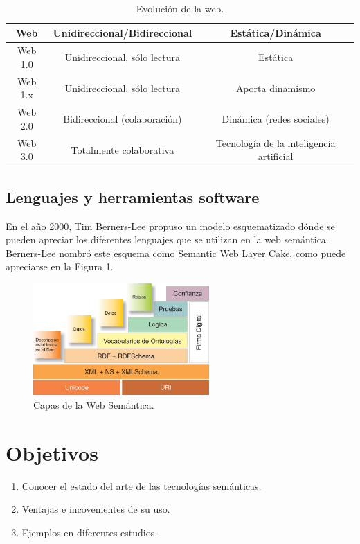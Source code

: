 \documentclass{article}
\begin{document}
\begin{table}[h]
\centering
\begin{tabular}{c c c} 
Web & Unidireccional/Bidireccional & Estática/Dinámica \\ \hline
Web 1.0 & Unidireccional, sólo lectura & Estática\\
Web 1.x & Unidireccional, sólo lectura & Aporta dinamismo \\
Web 2.0 & Bidireccional (colaboración) & Dinámica (redes sociales)\\
Web 3.0 & Totalmente colaborativa & Tecnología de la inteligencia artificial 
\end{tabular}
\caption{\label{tab:tabla ejemplo}Evolución de la web.}
\end{table}

\subsection{Lenguajes y herramientas software}
En el año 2000, Tim Berners-Lee propuso un modelo esquematizado dónde se pueden apreciar los diferentes lenguajes que se utilizan en la web semántica. Berners-Lee nombró este esquema como Semantic Web Layer Cake, como puede apreciarse en la Figura 1.


\begin{figure}[h]
\centering
\includegraphics[width=0.6\textwidth]{imagenes/modelo_capas.png}
\caption{\label{fig:modelo_capas}Capas de la Web Semántica.}
\end{figure}

\section{Objetivos}
\begin{enumerate}
    \item Conocer el estado del arte de las tecnologías semánticas.
    \item Ventajas e incovenientes de su uso.
    \item Ejemplos en diferentes estudios.
\end{enumerate}
\end{document}
